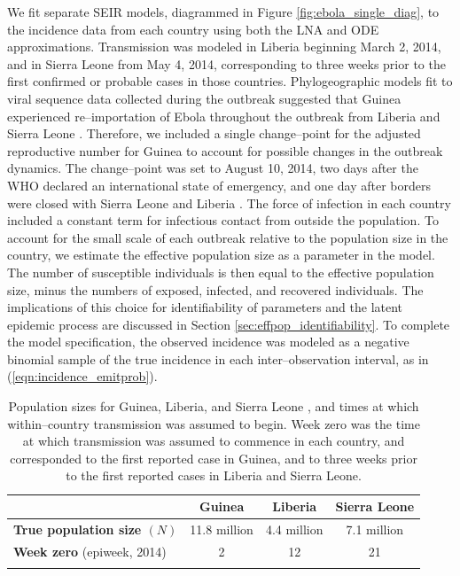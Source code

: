We fit separate SEIR models, diagrammed in Figure \ref{fig:ebola_single_diag}, to the incidence data from each country using both the LNA and ODE approximations. Transmission was modeled in Liberia beginning March 2, 2014, and in Sierra Leone from May 4, 2014, corresponding to three weeks prior to the first confirmed or probable cases in those countries. Phylogeographic models fit to viral sequence data collected during the outbreak suggested that Guinea experienced re--importation of Ebola throughout the outbreak from Liberia and Sierra Leone \cite{dudas2017virus}. Therefore, we included a single change--point for the adjusted reproductive number for Guinea to account for possible changes in the outbreak dynamics. The change--point was set to August 10, 2014, two days after the WHO declared an international state of emergency, and one day after borders were closed with Sierra Leone and Liberia \cite{coltart2017ebola}. The force of infection in each country included a constant term for infectious contact from outside the population. To account for the small scale of each outbreak relative to the population size in the country, we estimate the effective population size as a parameter in the model. The number of susceptible individuals is then equal to the effective population size, minus the numbers of exposed, infected, and recovered individuals. The implications of this choice for identifiability of parameters and the latent epidemic process are discussed in Section \ref{sec:effpop_identifiability}. To complete the model specification, the observed incidence was modeled as a negative binomial sample of the true incidence in each inter--observation interval, as in (\ref{eqn:incidence_emitprob}).

\begin{table}[htbp]
	\caption[Population sizes for Guinea, Liberia, and Sierra Leone, along with times at which transmission was assumed to begin.]{Population sizes for Guinea, Liberia, and Sierra Leone \cite{un2017popdat}, and times at which within--country transmission was assumed to begin. Week zero was the time at which transmission was assumed to commence in each country, and corresponded to the first reported case in Guinea, and to three weeks prior to the first reported cases in Liberia and Sierra Leone.}
	\label{tab:ebola_pops_t0}
	\footnotesize
	\centering
	\begin{tabular}{lccc}	
		\hline	
		& \textbf{Guinea} & \textbf{Liberia} & \textbf{Sierra Leone} \\\hline
		\textbf{True population size $ (N)$} & 11.8 million & 4.4 million & 7.1 million \\ 
		\textbf{Week zero} (epiweek, 2014) & 2 & 12 & 21 \\
		\hline
		&&&
	\end{tabular} 
\end{table}

